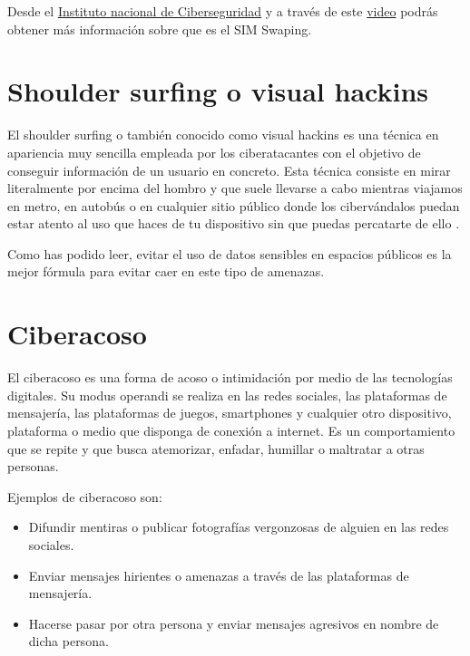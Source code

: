 \documentclass[
  spanish,
  a4paper,
  openany]{book}
\begin{document}
Desde el \href{https://www.incibe.es/}{Instituto nacional de Ciberseguridad} y a través de este \href{https://www.youtube.com/watch?v=fIaodow_nxw}{video} podrás obtener más información sobre que es el SIM Swaping.

\hypertarget{shoulder-surfing-o-visual-hackins}{%
\section{Shoulder surfing o visual hackins}\label{shoulder-surfing-o-visual-hackins}}

El shoulder surfing o también conocido como visual hackins es una técnica en apariencia muy sencilla empleada por los ciberatacantes con el objetivo de conseguir información de un usuario en concreto. Esta técnica consiste en mirar literalmente por encima del hombro y que suele llevarse a cabo mientras viajamos en metro, en autobús o en cualquier sitio público donde los cibervándalos puedan estar atento al uso que haces de tu dispositivo sin que puedas percatarte de ello \citep{OSI-shoulder-surfing}.

Como has podido leer, evitar el uso de datos sensibles en espacios públicos es la mejor fórmula para evitar caer en este tipo de amenazas.

\hypertarget{ciberacoso}{%
\section{Ciberacoso}\label{ciberacoso}}

El ciberacoso es una forma de acoso o intimidación por medio de las tecnologías digitales. Su modus operandi se realiza en las redes sociales, las plataformas de mensajería, las plataformas de juegos, smartphones y cualquier otro dispositivo, plataforma o medio que disponga de conexión a internet. Es un comportamiento que se repite y que busca atemorizar, enfadar, humillar o maltratar a otras personas.

Ejemplos de ciberacoso son:

\begin{itemize}
\item
  Difundir mentiras o publicar fotografías vergonzosas de alguien en las redes sociales.
\item
  Enviar mensajes hirientes o amenazas a través de las plataformas de mensajería.
\item
  Hacerse pasar por otra persona y enviar mensajes agresivos en nombre de dicha persona.
\end{itemize}
\end{document}
